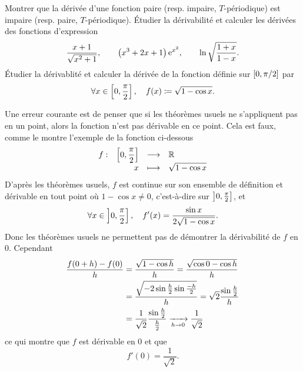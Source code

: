 \documentclass{magnoliaold}
\begin{document}
\begin{exos}
\exo Montrer que la dérivée d'une fonction paire (resp. impaire, $T$-périodique) est impaire (resp. paire, $T$-périodique).
\exo Étudier la dérivabilité et calculer les dérivées des fonctions
  d'expression
  \[\frac{x+1}{\sqrt{x^2+1}}, \qquad \left(x^3+2x+1\right){\rm e}^{x^2}, \qquad \ln\sqrt{\frac{1+x}{1-x}}.\]
\exo Étudier la dérivablité et calculer la dérivée de la fonction
  définie sur $\left[0,\pi/2\right]$ par
  \[\forall x\in\left[0,\frac{\pi}{2}\right] ,\quad 
    f(x)\coloneqq\sqrt{1-\cos x}.\]
  \begin{sol}
  Une erreur courante est de penser que si les théorèmes usuels ne
  s'appliquent pas en un point, alors la fonction n'est pas dérivable en ce
  point. Cela est faux, comme le montre l'exemple de la fonction ci-dessous
  \[\begin{array}[t]{lrcl} \displaystyle{f} : & \displaystyle{\left[0,\frac{\pi}{2}\right]} & \longrightarrow & \displaystyle{\mathbb{R}} \\ & \displaystyle{x} & \longmapsto & \displaystyle{\sqrt{1-\cos x}} \end{array}\]
  D'après les théorèmes usuels, $f$ est continue sur son ensemble de définition
  et dérivable en tout point où $1-\cos x\not=0$, c'est-à-dire sur
  $\left]0,\frac{\pi}{2}\right]$, et
  $$\forall x\in\left]0,\frac{\pi}{2}\right] ,\quad f'(x)=
    \frac{\sin x}{2\sqrt{1-\cos x}}.$$
  Donc les théorèmes usuels ne permettent pas de démontrer la dérivabilité de
  $f$ en $0$. Cependant
  \begin{equation*}
  \begin{split}
  \frac{f(0+h)-f(0)}{h} &=\frac{\sqrt{1-\cos h}}{h} =
                          \frac{\sqrt{\cos 0-\cos h}}{h}\\
                        &=\frac{\sqrt{-2\sin\frac{h}{2}\sin\frac{-h}{2}}}{h}=
                          \sqrt{2}\frac{\sin\frac{h}{2}}{h}\\
                        &=\frac{1}{\sqrt{2}}\frac{\sin\frac{h}{2}}{\frac{h}{2}}
                          \xrightarrow[h\rightarrow 0]{} \frac{1}{\sqrt{2}}
  \end{split}
  \end{equation*}
  ce qui montre que $f$ est dérivable en $0$ et que
  $$f'(0)=\frac{1}{\sqrt{2}}.$$    
  \end{sol}
\end{exos}
\end{document}
